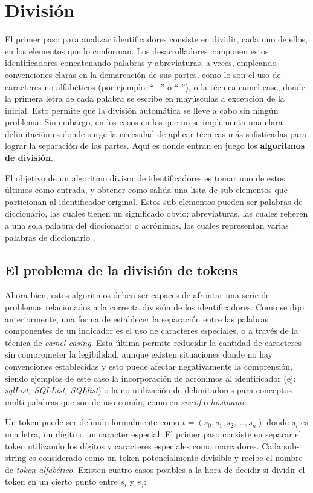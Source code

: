 \section{División}
El primer paso para analizar identificadores consiste en dividir, cada uno de ellos, en los elementos que lo conforman.
Los desarrolladores componen estos identificadores concatenando palabras y abreviaturas, a veces, empleando convenciones claras en la demarcación de sus partes, como lo son el uso de caracteres no alfabéticos (por ejemplo: ``\_'' o ``-''), o la técnica camel-case, donde la primera letra de cada palabra se escribe en mayúsculas a excepción de la inicial.
Esto permite que la división automática se lleve a cabo sin ningún problema.
Sin embargo, en los casos en los que no se implementa una clara delimitación es donde surge la necesidad de aplicar técnicas más sofisticadas para lograr la separación de las partes.
Aquí es donde entran en juego los \textbf{algoritmos de división}.
 
El objetivo de un algoritmo divisor de identificadores es tomar uno de estos últimos como entrada, y obtener como salida una lista de sub-elementos que particionan al identificador original.
Estos sub-elementos pueden ser palabras de diccionario, las cuales tienen un significado obvio; abreviaturas, las cuales refieren a una sola palabra del diccionario; o acrónimos, los cuales representan varias palabras de diccionario \cite{HillBinkleyLawrie14}.

\subsection{El problema de la división de tokens}
Ahora bien, estos algoritmos deben ser capaces de afrontar una serie de problemas relacionados a la correcta división de los identificadores.
Como se dijo anteriormente, una forma de establecer la separación entre las palabras componentes de un indicador es el uso de caracteres especiales, o a través de la técnica de \textit{camel-casing}.
Esta última permite reducidir la cantidad de caracteres sin comprometer la legibilidad, aunque existen situaciones donde no hay convenciones establecidas y esto puede afectar negativamente la comprensión, siendo ejemplos de este caso la incorporación de acrónimos al identificador (ej: \textit{sqlList, SQLList, SQLlist}) o la no utilización de delimitadores para conceptos multi palabras que son de uso común, como en \textit{sizeof} o \textit{hostname}.

Un token puede ser definido formalmente como $t = (s_0, s_1, s_2, ..., s_n)$ donde $s_i$ es una letra, un dígito o un caracter especial.
El primer paso consiste en separar el token utilizando los dígitos y caracteres especiales como marcadores.
Cada sub-string es considerado como un token potencialmente divisible y recibe el nombre de \textit{token alfabético}.
Existen cuatro casos posibles a la hora de decidir si dividir el token en un cierto punto entre $s_i$ y $s_j$\cite{EnslenHillPollock09}:

